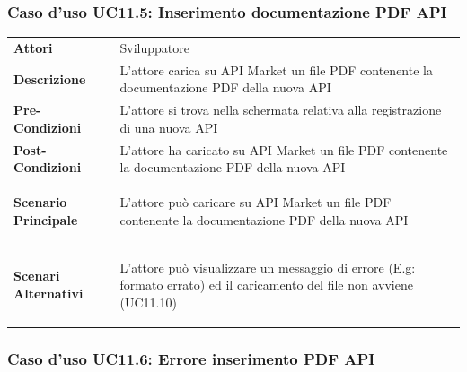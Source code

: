 \subsubsection{Caso d'uso UC11.5: Inserimento documentazione PDF API}
\label{UC11_5}

\begin{minipage}{\linewidth}
	\begin{tabular}{ l | p{11cm}}
		\hline
		\rowcolor{Gray}
		\multicolumn{2}{c}{UC11.5 - Inserimento documentazione PDF API} \\
		\hline
		\textbf{Attori} & Sviluppatore \\
		\textbf{Descrizione} & L'attore carica su API Market un file PDF contenente la documentazione PDF della nuova API \\
		\textbf{Pre-Condizioni} & L'attore si trova nella schermata relativa alla registrazione di una nuova API \\
		\textbf{Post-Condizioni} & L'attore ha caricato su API Market un file PDF contenente la documentazione PDF della nuova API \\
		\textbf{Scenario Principale} & 
		\begin{enumerate*}[label=(\arabic*.),itemjoin={\newline}]
			\item L'attore può caricare su API Market un file PDF contenente la documentazione PDF della nuova API
		\end{enumerate*}\\
		\textbf{Scenari Alternativi} & 
		\begin{enumerate*}[label=(\arabic*.),itemjoin={\newline}]
		\item L'attore può visualizzare un messaggio di errore (E.g: formato errato) ed il caricamento del file non avviene (UC11.10)
		\end{enumerate*}\\
	\end{tabular}
\end{minipage}

\subsubsection{Caso d'uso UC11.6: Errore inserimento PDF API}
\label{UC11_6}

